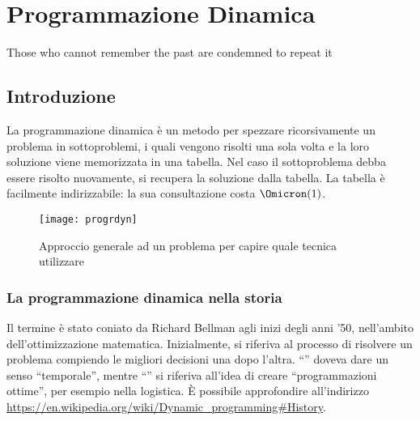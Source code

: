 
\ifsubfile
\usepackage[newfloat, cachedir=_minted-cache, outputdir=../build]{minted}
\usepackage{../libraries/set-minted}

\pagestyle{plain}
\setcounter{chapter}{12}


\fi
\chapter{Programmazione Dinamica}
\begin{fquote}
Those who cannot remember the past are condemned to repeat it
\end{fquote}

\section*{Introduzione}

La programmazione dinamica è un metodo per spezzare ricorsivamente un problema in
sottoproblemi, i quali vengono risolti una sola volta e la loro soluzione viene memorizzata in una tabella.
Nel caso il sottoproblema debba essere risolto nuovamente, si recupera la soluzione dalla tabella.
La tabella è facilmente indirizzabile: la sua consultazione costa \(\Omicron(1)\).

\begin{figure}[H]\centering
    \texttt{[image: progrdyn]}
    \caption{Approccio generale ad un problema per capire quale tecnica utilizzare}
\end{figure}

\subsection*{La programmazione dinamica nella storia}

Il termine  è stato coniato da Richard Bellman agli inizi degli anni '50, nell'ambito dell'ottimizzazione matematica.
Inizialmente, si riferiva al processo di risolvere un problema compiendo le migliori decisioni una dopo l'altra.
\enquote{} doveva dare un senso \enquote{temporale}, mentre \enquote{} si riferiva all'idea di creare \enquote{programmazioni ottime}, per esempio nella logistica.
\`{E} possibile approfondire all'indirizzo \url{https://en.wikipedia.org/wiki/Dynamic_programming#History}.

